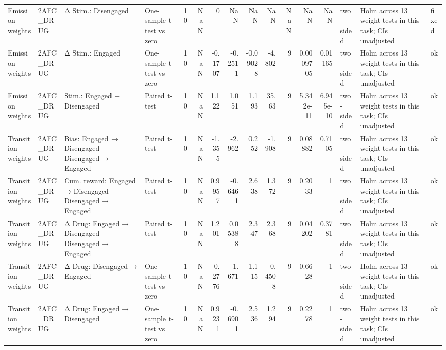 \begin{tabular}{llllrrrrrrrrrlll}
Emission weights & 2AFC\_DRUG & Δ Stim.: Disengaged & One-sample t-test vs zero & 10 & NaN & 0 & NaN & NaN & NaN & NaN & NaN & NaN & two-sided & Holm across 13 weight tests in this task; CIs unadjusted & fixed \\
Emission weights & 2AFC\_DRUG & Δ Stim.: Engaged & One-sample t-test vs zero & 10 & NaN & -0.1707 & -0.2511 & -0.09028 & -4.802 & 9 & 0.0009705 & 0.01165 & two-sided & Holm across 13 weight tests in this task; CIs unadjusted & ok \\
Emission weights & 2AFC\_DRUG & Stim.: Engaged − Disengaged & Paired t-test & 10 & NaN & 1.122 & 1.051 & 1.193 & 35.63 & 9 & 5.342e-11 & 6.945e-10 & two-sided & Holm across 13 weight tests in this task; CIs unadjusted & ok \\
Transition weights & 2AFC\_DRUG & Bias: Engaged → Disengaged − Disengaged → Engaged & Paired t-test & 10 & NaN & -1.355 & -2.962 & 0.252 & -1.908 & 9 & 0.08882 & 0.7105 & two-sided & Holm across 13 weight tests in this task; CIs unadjusted & ok \\
Transition weights & 2AFC\_DRUG & Cum. reward: Engaged → Disengaged − Disengaged → Engaged & Paired t-test & 10 & NaN & 0.9957 & -0.6461 & 2.638 & 1.372 & 9 & 0.2033 & 1 & two-sided & Holm across 13 weight tests in this task; CIs unadjusted & ok \\
Transition weights & 2AFC\_DRUG & Δ Drug: Engaged → Disengaged − Disengaged → Engaged & Paired t-test & 10 & NaN & 1.201 & 0.05388 & 2.347 & 2.368 & 9 & 0.04202 & 0.3781 & two-sided & Holm across 13 weight tests in this task; CIs unadjusted & ok \\
Transition weights & 2AFC\_DRUG & Δ Drug: Disengaged → Engaged & One-sample t-test vs zero & 10 & NaN & -0.2776 & -1.671 & 1.115 & -0.4508 & 9 & 0.6628 & 1 & two-sided & Holm across 13 weight tests in this task; CIs unadjusted & ok \\
Transition weights & 2AFC\_DRUG & Δ Drug: Engaged → Disengaged & One-sample t-test vs zero & 10 & NaN & 0.9231 & -0.6901 & 2.536 & 1.294 & 9 & 0.2278 & 1 & two-sided & Holm across 13 weight tests in this task; CIs unadjusted & ok \\
\bottomrule
\end{tabular}
